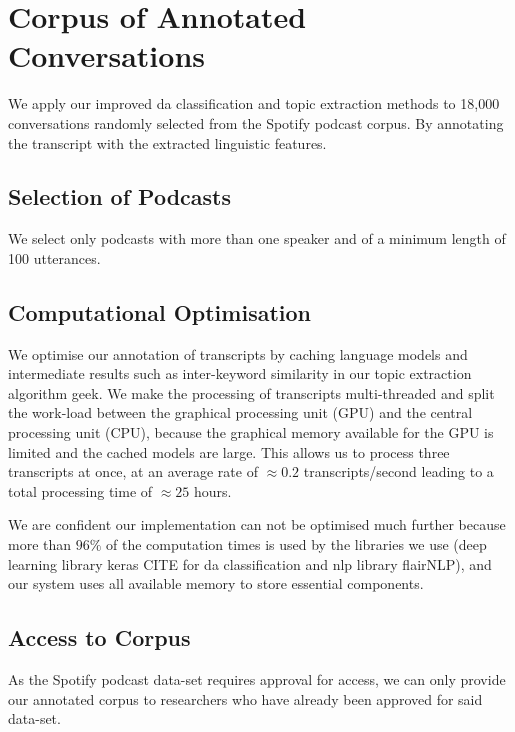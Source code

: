 {\let\clearpage\relax \chapter[Annotated Corpus]{Corpus of Annotated Conversations}}

We apply our improved \gls{da} classification and topic extraction methods to 18,000 conversations randomly selected from the Spotify podcast corpus\cite{clifton-2020100000}. By annotating the transcript with the extracted linguistic features.

\section{Selection of Podcasts}
We select only podcasts with more than one speaker and of a minimum length of 100 \glspl{utterance}.

\section{Computational Optimisation}
We optimise our annotation of transcripts by caching language \glspl{model} and intermediate results such as inter-keyword similarity in our topic extraction algorithm \gls{geek}.
We make the processing of transcripts multi-threaded and split the work-load between the graphical processing unit (GPU) and the central processing unit (CPU), because the graphical memory available for the GPU is limited and the cached \glspl{model} are large. This allows us to process three transcripts at once, at an average rate of $\approx 0.2$ transcripts/second leading to a total processing time of $\approx 25$ hours.

We are confident our implementation can not be optimised much further because more than $96\%$ of the computation times is used by the libraries we use (deep learning library keras CITE for \gls{da} classification and \gls{nlp} library flairNLP\cite{flairNLP}), and our system uses all available memory to store essential components.

\section{Access to Corpus}

As the Spotify podcast data-set requires approval for access, we can only provide our annotated corpus to researchers who have already been approved for said data-set. \newline
